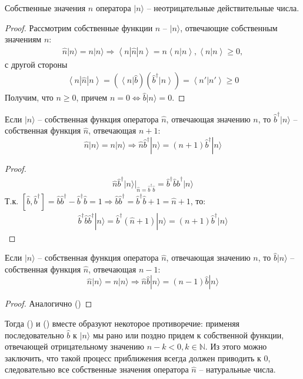 \begin{theorem}
Собственные значения $n$ оператора $|n\rangle$ -- неотрицательные действительные числа.
\end{theorem}
\begin{proof}
Рассмотрим собственные функции $\hat{n}$ -- $|n\rangle$, отвечающие собственным значениям $n$:
\begin{gather*}
\hat{n}|n\rangle = n|n\rangle
\Longrightarrow
\left< n| \hat{n}|n\right> = n \left<n|n\right>, \left<n|n\right> \ge 0,
\end{gather*}
с другой стороны
\begin{gather*}
\left< n| \hat{n}|n\right> = (\left< n\right|\hat{b})(\hat{b}^\dagger\left|n\right>) =
\left< n'|n'\right> \ge 0
\end{gather*}
Получим, что $n\ge 0$, причем $n=0\Leftrightarrow \hat{b}|n\rangle = 0$.
\end{proof}
\begin{theorem}
Если $|n\rangle$ -- собственная функция оператора $\hat{n}$, отвечающая значению $n$, то $\hat{b}^\dagger|n\rangle$ -- собственная функция $\hat{n}$, отвечающая $n+1$:
$$
\hat{n}|n\rangle=n|n\rangle\Longrightarrow\hat{n}\hat{b}^\dagger|n\rangle=(n+1)\hat{b}^\dagger|n\rangle
$$
\end{theorem}
\begin{proof}
\begin{gather*}
\hat{n}\hat{b}^\dagger|n\rangle
|_{\hat{n}=\hat{b}^\dagger\hat{b}}
=
\hat{b}^\dagger\hat{b}\hat{b}^\dagger|n\rangle
\end{gather*}
Т.к. $[\hat{b},\hat{b}^\dagger]=\hat{b}\hat{b}^\dagger-\hat{b}^\dagger\hat{b}=1\Longrightarrow\hat{b}\hat{b}^\dagger=\hat{b}^\dagger\hat{b}+1=\hat{n}+1$, то:
\begin{gather*}
\hat{b}^\dagger\hat{b}\hat{b}^\dagger|n\rangle
=
\hat{b}^\dagger(\hat{n}+1)|n\rangle
=
(n+1)\hat{b}^\dagger|n\rangle
\end{gather*}
\end{proof}
\begin{theorem}
Если $|n\rangle$ -- собственная функция оператора $\hat{n}$, отвечающая значению $n$, то $\hat{b}|n\rangle$ -- собственная функция $\hat{n}$, отвечающая $n-1$:
$$
\hat{n}|n\rangle=n|n\rangle\Longrightarrow\hat{n}\hat{b}|n\rangle=(n-1)\hat{b}|n\rangle
$$
\end{theorem}
\begin{proof}
Аналогично ()
\end{proof}
Тогда () и () вместе образуют некоторое противоречие: применяя последовательно $\hat{b}$ к $|n\rangle$ мы рано или поздно придем к собственной функции, отвечающей отрицательному значению $n-k<0,k\in\mathbb{N}$. Из этого можно заключить, что такой процесс приближения всегда должен приводить к $0$, следовательно все собственные значения оператора $\hat{n}$ -- натуральные числа.

